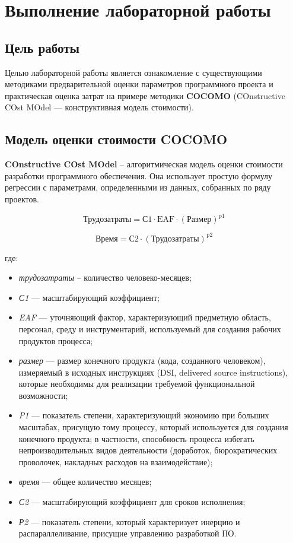 \chapter{Выполнение лабораторной работы}


\section{Цель работы}

Целью лабораторной работы является ознакомление с существующими методиками предварительной оценки параметров программного проекта и практическая оценка затрат на примере методики \textbf{COCOMO} (COnstructive COst MOdel — конструктивная модель стоимости).


\section{Модель оценки стоимости COCOMO}

\textbf{COnstructive COst MOdel} -- алгоритмическая модель оценки стоимости разработки программного обеспечения. Она использует простую формулу регрессии с параметрами, определенными из данных, собранных по ряду проектов.

\begin{equation}
    \text{Трудозатраты} = \text{С1} \cdot \text{EAF} \cdot (\text{Размер})^{\text{p1}}
\end{equation}

\begin{equation}
    \text{Время} = \text{С2} \cdot (\text{Трудозатраты})^{\text{p2}}
\end{equation}

\noindent где:

\begin{itemize}
    \item \textit{трудозатраты} -- количество человеко-месяцев;
    \item \textit{С1} — масштабирующий коэффициент;
    \item \textit{EAF} — уточняющий фактор, характеризующий предметную область, персонал, среду и инструментарий, используемый для создания рабочих продуктов процесса;
    \item \textit{размер} — размер конечного продукта (кода, созданного человеком), измеряемый в исходных инструкциях (DSI, delivered source instructions), которые необходимы для реализации требуемой функциональной возможности;
    \item \textit{P1} — показатель степени, характеризующий экономию при больших масштабах, присущую тому процессу, который используется для создания конечного продукта; в частности, способность процесса избегать непроизводительных видов деятельности (доработок, бюрократических проволочек, накладных расходов на взаимодействие);
    \item \textit{время} — общее количество месяцев;
    \item \textit{С2} — масштабирующий коэффициент для сроков исполнения;
    \item \textit{Р2} — показатель степени, который характеризует инерцию и распараллеливание, присущие управлению разработкой ПО.
\end{itemize}


